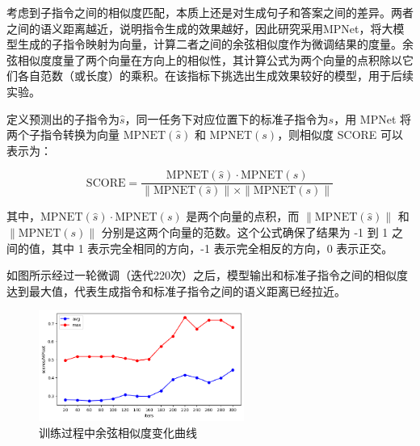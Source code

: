 \documentclass[bachelor]{thesis-uestc}
\begin{document}
考虑到子指令之间的相似度匹配，本质上还是对生成句子和答案之间的差异。两者之间的语义距离越近，说明指令生成的效果越好，因此研究采用MPNet\cite{songMPNetMaskedPermuted2020}，将大模型生成的子指令映射为向量，计算二者之间的余弦相似度作为微调结果的度量。余弦相似度度量了两个向量在方向上的相似性，其计算公式为两个向量的点积除以它们各自范数（或长度）的乘积。在该指标下挑选出生成效果较好的模型，用于后续实验。

定义预测出的子指令为$\hat{s}$，同一任务下对应位置下的标准子指令为$s$，用 MPNet 将两个子指令转换为向量 \( \text{MPNET}(\hat{s}) \) 和 \( \text{MPNET}(s) \)，则相似度 SCORE 可以表示为：

\begin{equation}
    \text{SCORE} = \frac{\text{MPNET}(\hat{s}) \cdot \text{MPNET}(s)}{\|\text{MPNET}(\hat{s})\| \times \|\text{MPNET}(s)\|}
\label{mps}
\end{equation}

其中，\( \text{MPNET}(\hat{s}) \cdot \text{MPNET}(s) \) 是两个向量的点积，而 \( \|\text{MPNET}(\hat{s})\| \) 和 \( \|\text{MPNET}(s)\| \) 分别是这两个向量的范数。这个公式确保了结果为 -1 到 1 之间的值，其中 1 表示完全相同的方向，-1 表示完全相反的方向，0 表示正交。

如图所示经过一轮微调（迭代220次）之后，模型输出和标准子指令之间的相似度达到最大值，代表生成指令和标准子指令之间的语义距离已经拉近。

\begin {figure}[h]
\centering %
\includegraphics[width=0.6\textwidth]{4801-042816.png}
\caption{训练过程中余弦相似度变化曲线} %
\label{mpnet}
\end {figure}
\end{document}

